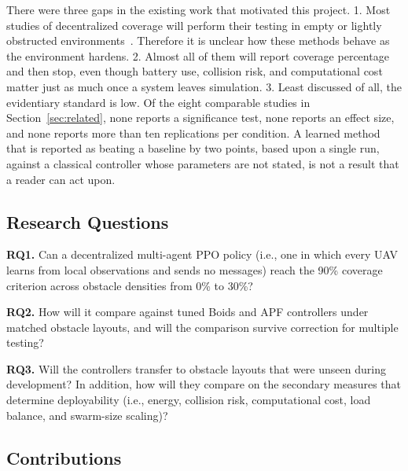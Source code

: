 \documentclass[a4paper, 10pt, conference]{ieeeconf}
\begin{document}
There were three gaps in the existing work that motivated this
project. 1. Most studies of decentralized coverage will perform their
testing in empty or lightly obstructed environments~\cite{zhu2023}.
Therefore it is unclear how these methods behave as the environment
hardens. 2. Almost all of them will report coverage percentage and
then stop, even though battery use, collision risk, and computational
cost matter just as much once a system leaves simulation. 3. Least
discussed of all, the evidentiary standard is low. Of the eight
comparable studies in Section~\ref{sec:related}, none reports a
significance test, none reports an effect size, and none reports more
than ten replications per condition. A learned method that is reported
as beating a baseline by two points, based upon a single run, against
a classical controller whose parameters are not stated, is not a
result that a reader can act upon.

\subsection{Research Questions}

\textbf{RQ1.} Can a decentralized multi-agent PPO policy (i.e., one in
which every UAV learns from local observations and sends no messages)
reach the 90\% coverage criterion across obstacle densities from 0\%
to 30\%?

\textbf{RQ2.} How will it compare against tuned Boids and APF
controllers under matched obstacle layouts, and will the comparison
survive correction for multiple testing?

\textbf{RQ3.} Will the controllers transfer to obstacle layouts that
were unseen during development? In addition, how will they compare on
the secondary measures that determine deployability (i.e., energy,
collision risk, computational cost, load balance, and swarm-size
scaling)?

\subsection{Contributions}
\end{document}
